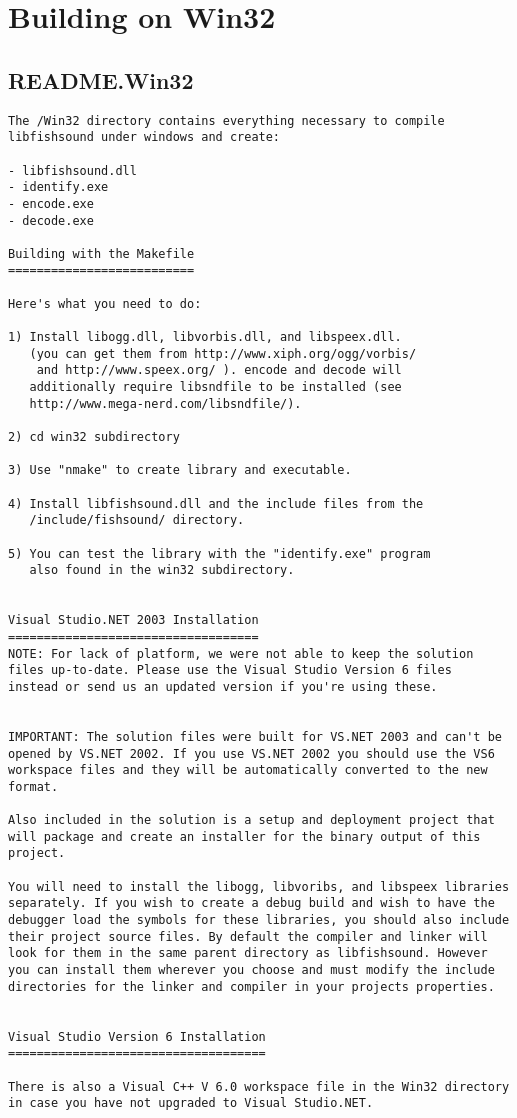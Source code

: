 \section{Building on Win32}
\label{group__win32}
\subsection{README.Win32}\label{win32}


\footnotesize\begin{verbatim}The /Win32 directory contains everything necessary to compile
libfishsound under windows and create:

- libfishsound.dll
- identify.exe
- encode.exe
- decode.exe

Building with the Makefile
==========================

Here's what you need to do:

1) Install libogg.dll, libvorbis.dll, and libspeex.dll.
   (you can get them from http://www.xiph.org/ogg/vorbis/ 
    and http://www.speex.org/ ). encode and decode will
   additionally require libsndfile to be installed (see
   http://www.mega-nerd.com/libsndfile/).

2) cd win32 subdirectory

3) Use "nmake" to create library and executable.

4) Install libfishsound.dll and the include files from the
   /include/fishsound/ directory.

5) You can test the library with the "identify.exe" program
   also found in the win32 subdirectory.


Visual Studio.NET 2003 Installation
===================================
NOTE: For lack of platform, we were not able to keep the solution
files up-to-date. Please use the Visual Studio Version 6 files
instead or send us an updated version if you're using these.


IMPORTANT: The solution files were built for VS.NET 2003 and can't be
opened by VS.NET 2002. If you use VS.NET 2002 you should use the VS6
workspace files and they will be automatically converted to the new
format.

Also included in the solution is a setup and deployment project that
will package and create an installer for the binary output of this
project.

You will need to install the libogg, libvoribs, and libspeex libraries
separately. If you wish to create a debug build and wish to have the
debugger load the symbols for these libraries, you should also include
their project source files. By default the compiler and linker will
look for them in the same parent directory as libfishsound. However
you can install them wherever you choose and must modify the include
directories for the linker and compiler in your projects properties.


Visual Studio Version 6 Installation
====================================

There is also a Visual C++ V 6.0 workspace file in the Win32 directory
in case you have not upgraded to Visual Studio.NET.
\end{verbatim}
\normalsize
 